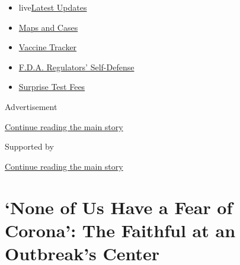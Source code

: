 \begin{itemize}
\tightlist
\item
  live\href{https://www.nytimes3xbfgragh.onion/2020/09/12/world/covid-19-coronavirus.html?name=styln-coronavirus-national\&region=TOP_BANNER\&block=storyline_menu_recirc\&action=click\&pgtype=Article\&impression_id=df21ec91-f52c-11ea-868d-8bbf3a530245\&variant=undefined}{Latest
  Updates}
\item
  \href{https://www.nytimes3xbfgragh.onion/interactive/2020/us/coronavirus-us-cases.html?name=styln-coronavirus-national\&region=TOP_BANNER\&block=storyline_menu_recirc\&action=click\&pgtype=Article\&impression_id=df2213a0-f52c-11ea-868d-8bbf3a530245\&variant=undefined}{Maps
  and Cases}
\item
  \href{https://www.nytimes3xbfgragh.onion/interactive/2020/science/coronavirus-vaccine-tracker.html?name=styln-coronavirus-national\&region=TOP_BANNER\&block=storyline_menu_recirc\&action=click\&pgtype=Article\&impression_id=df2213a1-f52c-11ea-868d-8bbf3a530245\&variant=undefined}{Vaccine
  Tracker}
\item
  \href{https://www.nytimes3xbfgragh.onion/2020/09/10/us/politics/fda-coronavirus-vaccine.html?name=styln-coronavirus-national\&region=TOP_BANNER\&block=storyline_menu_recirc\&action=click\&pgtype=Article\&impression_id=df2213a2-f52c-11ea-868d-8bbf3a530245\&variant=undefined}{F.D.A.
  Regulators' Self-Defense}
\item
  \href{https://www.nytimes3xbfgragh.onion/2020/09/09/upshot/coronavirus-surprise-test-fees.html?name=styln-coronavirus-national\&region=TOP_BANNER\&block=storyline_menu_recirc\&action=click\&pgtype=Article\&impression_id=df2213a3-f52c-11ea-868d-8bbf3a530245\&variant=undefined}{Surprise
  Test Fees}
\end{itemize}

Advertisement

\protect\hyperlink{after-top}{Continue reading the main story}

Supported by

\protect\hyperlink{after-sponsor}{Continue reading the main story}

\hypertarget{none-of-us-have-a-fear-of-corona-the-faithful-at-an-outbreaks-center}{%
\section{`None of Us Have a Fear of Corona': The Faithful at an
Outbreak's
Center}\label{none-of-us-have-a-fear-of-corona-the-faithful-at-an-outbreaks-center}}


